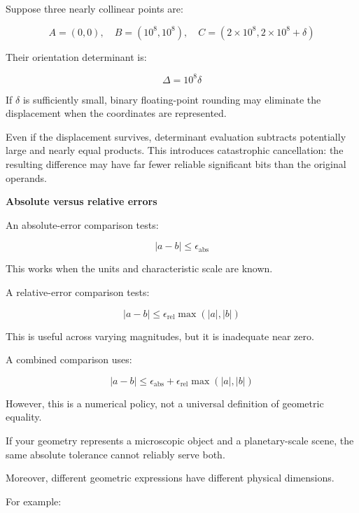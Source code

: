 Suppose three nearly collinear points are:

\[
A=(0,0),\quad B=(10^8,10^8),\quad C=(2\times10^8,2\times10^8+\delta)
\]

Their orientation determinant is:

\[
\Delta=10^8\delta
\]

If \(\delta\) is sufficiently small, binary floating-point rounding may eliminate the displacement when the coordinates are represented.

Even if the displacement survives, determinant evaluation subtracts potentially large and nearly equal products. This introduces catastrophic cancellation: the resulting difference may have far fewer reliable significant bits than the original operands.

\textbf{Absolute versus relative errors}

An absolute-error comparison tests:

\[
|a-b|\le\epsilon_{\mathrm{abs}}
\]

This works when the units and characteristic scale are known.

A relative-error comparison tests:

\[
|a-b|\le\epsilon_{\mathrm{rel}} \max(|a|,|b|)
\]

This is useful across varying magnitudes, but it is inadequate near zero.

A combined comparison uses:

\[
|a-b| \le \epsilon_{\mathrm{abs}} + \epsilon_{\mathrm{rel}}\max(|a|,|b|)
\]

However, this is a numerical policy, not a universal definition of geometric equality.

If your geometry represents a microscopic object and a planetary-scale scene, the same absolute tolerance cannot reliably serve both.

Moreover, different geometric expressions have different physical dimensions.

For example:

